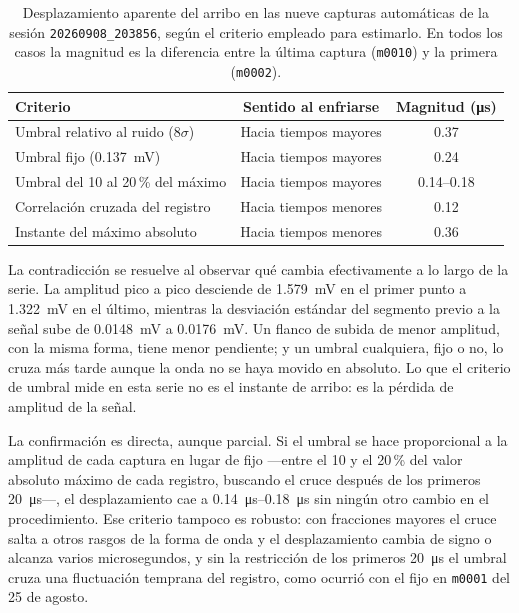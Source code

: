 \begin{table}[H]
  \centering
  \caption{Desplazamiento aparente del arribo en las nueve capturas
           automáticas de la sesión \texttt{20260908\_203856}, según el
           criterio empleado para estimarlo. En todos los casos la
           magnitud es la diferencia entre la última captura
           (\texttt{m0010}) y la primera (\texttt{m0002}).}
  \label{tab:umbral_amplitud}
  \begin{tabular}{lcc}
    \toprule
    Criterio & Sentido al enfriarse & Magnitud (\si{\micro\second}) \\
    \midrule
    Umbral relativo al ruido ($8\sigma$) & Hacia tiempos mayores & 0.37 \\
    Umbral fijo (\SI{0.137}{\milli\volt}) & Hacia tiempos mayores & 0.24 \\
    Umbral del 10 al 20\,\% del máximo & Hacia tiempos mayores & 0.14--0.18 \\
    Correlación cruzada del registro & Hacia tiempos menores & 0.12 \\
    Instante del máximo absoluto & Hacia tiempos menores & 0.36 \\
    \bottomrule
  \end{tabular}
\end{table}

La contradicción se resuelve al observar qué cambia efectivamente a lo
largo de la serie. La amplitud pico a pico desciende de
\SI{1.579}{\milli\volt} en el primer punto a \SI{1.322}{\milli\volt} en
el último, mientras la desviación estándar del segmento previo a la
señal sube de \SI{0.0148}{\milli\volt} a \SI{0.0176}{\milli\volt}. Un
flanco de subida de menor amplitud, con la misma forma, tiene menor
pendiente; y un umbral cualquiera, fijo o no, lo cruza más tarde
aunque la onda no se haya movido en absoluto. Lo que el criterio de
umbral mide en esta serie no es el instante de arribo: es la pérdida
de amplitud de la señal.

La confirmación es directa, aunque parcial. Si el umbral se hace
proporcional a la amplitud de cada captura en lugar de fijo ---entre el
10 y el 20\,\% del valor absoluto máximo de cada registro, buscando el
cruce después de los primeros \SI{20}{\micro\second}---, el
desplazamiento cae a \SIrange{0.14}{0.18}{\micro\second} sin ningún
otro cambio en el procedimiento. Ese criterio tampoco es robusto: con
fracciones mayores el cruce salta a otros rasgos de la forma de onda y
el desplazamiento cambia de signo o alcanza varios microsegundos, y sin
la restricción de los primeros \SI{20}{\micro\second} el umbral cruza
una fluctuación temprana del registro, como ocurrió con el fijo en
\texttt{m0001} del 25 de agosto.

